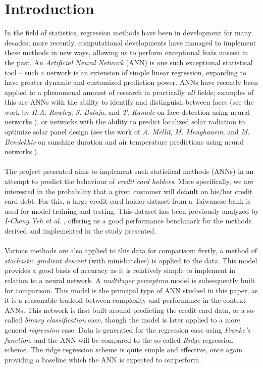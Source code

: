 \section{Introduction}
    In the field of statistics, regression methods have been in development for many decades; more recently, computational developments have managed to implement these methods in new ways, allowing us to perform exceptional feats unseen in the past. An \textit{Artificial Neural Network} (ANN) is one such exceptional statistical tool – such a network is an extension of simple linear regression, expanding to have greater dynamic and customized prediction power. ANNs have recently been applied to a phenomenal amount of research in practically \textit{all} fields; examples of this are ANNs with the ability to identify and distinguish between faces (see the work by \textit{H.A. Rowley}, \textit{S. Baluja}, and \textit{T. Kanade} on face detection using neural networks \cite{NNWfacedetection}), or networks with the ability to predict localized solar radiation to optimize solar panel design (see the work of \textit{A. Mellit}, \textit{M. Menghanem}, and \textit{M. Bendekhis} on sunshine duration and air temperature predictions using neural networks \cite{NNWsunshine}). \\\\
    The project presented aims to implement such statistical methods (ANNs) in an attempt to predict the behaviour of \textit{credit card holders}. More specifically, we are interested in the probability that a given customer will default on his/her credit card debt. For this, a large credit card holder dataset from a Taiwanese bank is used for model training and testing. This dataset has been previously analyzed by \textit{I-Cheng Yeh et al.} \cite{CCdata}, offering us a good performance benchmark for the methods derived and implemented in the study presented. \\\\
    Various methods are also applied to this data for comparison: firstly, a method of \textit{stochastic gradient descent} (with mini-batches) is applied to the data. This model provides a good basis of accuracy as it is relatively simple to implement in relation to a neural network. A \textit{multilayer perceptron} model is subsequently built for comparison. This model is the principal type of ANN studied in this paper, as it is a reasonable tradeoff between complexity and performance in the context ANNs. This network is first built around predicting the credit card data, or a so-called \textit{binary classification} case, though the model is later applied to a more general \textit{regression} case. Data is generated for the regression case using \textit{Franke's function}, and the ANN will be compared to the so-called \textit{Ridge} regression scheme. The ridge regression scheme is quite simple and effective, once again providing a baseline which the ANN is expected to outperform.\\\\
